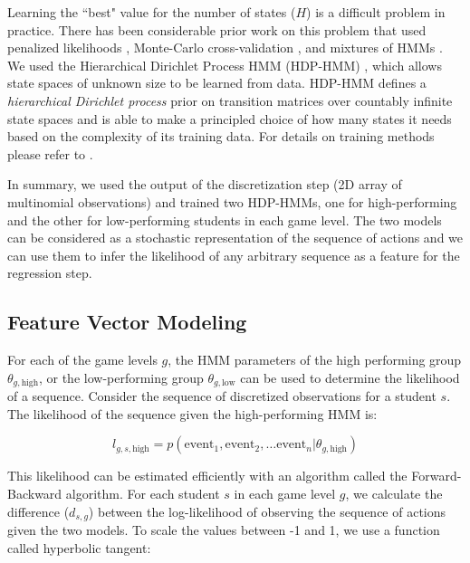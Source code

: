 \documentclass{sigchi}
\begin{document}
	Learning the ``best" value for the number of states ($H$) is a difficult problem in practice. 
	There has been considerable prior work on this problem that used penalized likelihoods \cite{rabiner1989hmm}, Monte-Carlo cross-validation \cite{smyth1996clustering}, and mixtures of HMMs \cite{smyth1997clustering}.
	We used the Hierarchical Dirichlet Process HMM (HDP-HMM) \cite{fox2008hdp}, which allows state spaces of unknown size to be learned from data. 
	HDP-HMM defines a \textit{hierarchical Dirichlet process} prior on transition matrices over countably infinite state spaces and is able to make a principled choice of how many states it needs based on the complexity of its training data. 
	For details on training methods please refer to \cite{fox2008hdp}.
	
	In summary, we used the output of the discretization step (2D array of multinomial observations) and trained two HDP-HMMs, one for high-performing and the other for low-performing students in each game level. 
	The two models can be considered as a stochastic representation of the sequence of actions and we can use them to infer the likelihood of any arbitrary sequence as a feature for the regression step. 
	
	\subsection{Feature Vector Modeling}

	For each of the game levels $g$, the HMM parameters of the high performing group $\theta_{g,\text{high}}$, or the low-performing group  $\theta_{g,\text{low}}$ can be used to determine the likelihood of a sequence.
	Consider the sequence of discretized observations for a student $s$.
	The likelihood of the sequence given the high-performing HMM is:
	
	\begin{equation}
	 l_{g, s, \text{high}} =  p( \text{event}_1,\text{event}_2, \dots \text{event}_n | \theta_{g,\text{high}} ) 
	\end{equation}
	
	This likelihood can be estimated efficiently with an algorithm called the Forward-Backward algorithm. 
	For each student $s$ in each game level $g$, we calculate the difference ($d_{s,g}$) between the log-likelihood of observing the sequence of actions given the two models. 
	To scale the values between -1 and 1, we use a function called hyperbolic tangent: 
	
\end{document}
